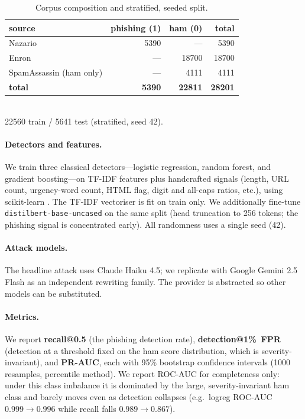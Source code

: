 \documentclass[11pt]{article}
\begin{document}
\begin{table}[t]
\centering
\caption{Corpus composition and stratified, seeded split.}
\label{tab:corpus}
\begin{tabular}{lrrr}
\toprule
source & phishing (1) & ham (0) & total \\
\midrule
Nazario & \num{5390} & --- & \num{5390} \\
Enron & --- & \num{18700} & \num{18700} \\
SpamAssassin (ham only) & --- & \num{4111} & \num{4111} \\
\midrule
\textbf{total} & \textbf{\num{5390}} & \textbf{\num{22811}} & \textbf{\num{28201}} \\
\bottomrule
\end{tabular}
\\[2pt]
{\footnotesize \num{22560} train / \num{5641} test (stratified, seed 42).}
\end{table}

\paragraph{Detectors and features.} We train three classical detectors---logistic
regression, random forest, and gradient boosting---on TF-IDF features plus
handcrafted signals (length, URL count, urgency-word count, HTML flag, digit and
all-caps ratios, etc.), using scikit-learn \citep{pedregosa2011scikitlearn}. The
TF-IDF vectoriser is fit on train only. We additionally fine-tune
\texttt{distilbert-base-uncased} \citep{sanh2019distilbert} on the same split (head
truncation to 256 tokens; the phishing signal is concentrated early). All
randomness uses a single seed (42).

\paragraph{Attack models.} The headline attack uses Claude Haiku 4.5; we replicate
with Google Gemini 2.5 Flash as an independent rewriting family. The provider is
abstracted so other models can be substituted.

\paragraph{Metrics.} We report \textbf{recall@0.5} (the phishing detection rate),
\textbf{detection@1\%~FPR} (detection at a threshold fixed on the ham score
distribution, which is severity-invariant), and \textbf{PR-AUC}, each with 95\%
bootstrap confidence intervals (\num{1000} resamples, percentile method). We report
ROC-AUC for completeness only: under this class imbalance it is dominated by the
large, severity-invariant ham class and barely moves even as detection collapses
(e.g.\ logreg ROC-AUC $0.999\!\to\!0.996$ while recall falls
$0.989\!\to\!0.867$).
\end{document}
